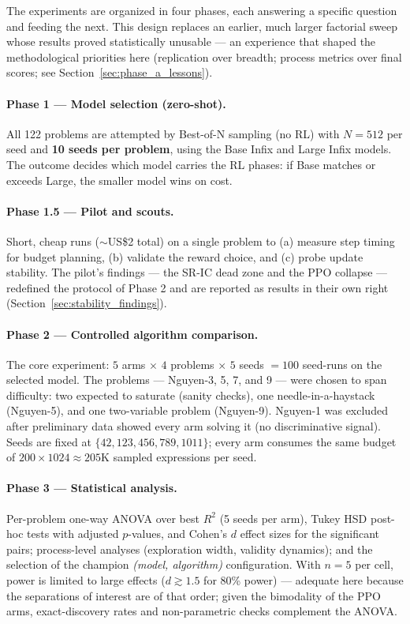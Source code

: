 The experiments are organized in four phases, each answering a specific question and feeding the next. This design replaces an earlier, much larger factorial sweep whose results proved statistically unusable --- an experience that shaped the methodological priorities here (replication over breadth; process metrics over final scores; see Section~\ref{sec:phase_a_lessons}).

\paragraph{Phase 1 --- Model selection (zero-shot).} All 122 problems are attempted by Best-of-N sampling (no RL) with $N=512$ per seed and \textbf{10 seeds per problem}, using the Base Infix and Large Infix models. The outcome decides which model carries the RL phases: if Base matches or exceeds Large, the smaller model wins on cost.

\paragraph{Phase 1.5 --- Pilot and scouts.} Short, cheap runs ($\sim$US\$2 total) on a single problem to (a) measure step timing for budget planning, (b) validate the reward choice, and (c) probe update stability. The pilot's findings --- the SR-IC dead zone and the PPO collapse --- redefined the protocol of Phase 2 and are reported as results in their own right (Section~\ref{sec:stability_findings}).

\paragraph{Phase 2 --- Controlled algorithm comparison.} The core experiment: $5$ arms $\times$ $4$ problems $\times$ $5$ seeds $= 100$ seed-runs on the selected model. The problems --- Nguyen-3, 5, 7, and 9 --- were chosen to span difficulty: two expected to saturate (sanity checks), one needle-in-a-haystack (Nguyen-5), and one two-variable problem (Nguyen-9). Nguyen-1 was excluded after preliminary data showed every arm solving it (no discriminative signal). Seeds are fixed at $\{42, 123, 456, 789, 1011\}$; every arm consumes the same budget of $200 \times 1024 \approx 205$K sampled expressions per seed.

\paragraph{Phase 3 --- Statistical analysis.} Per-problem one-way ANOVA over best $R^2$ (5 seeds per arm), Tukey HSD post-hoc tests with adjusted $p$-values, and Cohen's $d$ effect sizes for the significant pairs; process-level analyses (exploration width, validity dynamics); and the selection of the champion \emph{(model, algorithm)} configuration. With $n=5$ per cell, power is limited to large effects ($d \gtrsim 1.5$ for 80\% power) --- adequate here because the separations of interest are of that order; given the bimodality of the PPO arms, exact-discovery rates and non-parametric checks complement the ANOVA.

